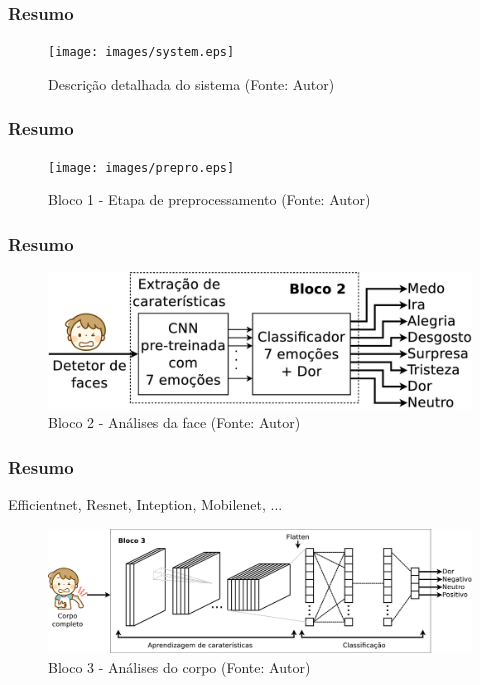 \begin{frame}
\frametitle{Resumo}
\begin{figure}[h!]
\centering
\texttt{[image: images/system.eps]}
\caption{Descrição detalhada do sistema (Fonte: Autor)}
\label{fig:system}
\end{figure} 
\end{frame}

\begin{frame}
\frametitle{Resumo}
\begin{figure}[h!]
\centering
\texttt{[image: images/prepro.eps]}
\caption{Bloco 1 - Etapa de preprocessamento (Fonte: Autor)}
\label{fig:prepro}
\end{figure} 
\end{frame}

\begin{frame}
\frametitle{Resumo}

\begin{figure}[h!]
\centering
\includegraphics[width=0.95\linewidth]{images/system-bloco2.eps}
\caption{Bloco 2 - Análises da face (Fonte: Autor)}
\label{fig:bloco2}
\end{figure} 
\end{frame}


\begin{frame}
\frametitle{Resumo}
Efficientnet, Resnet, Inteption, Mobilenet, ...
\begin{figure}[h!]
\centering
\includegraphics[width=0.95\linewidth]{images/body-image-bloco3.eps}
\caption{Bloco 3 - Análises do corpo (Fonte: Autor)}
\label{fig:bloco3}
\end{figure} 
\end{frame}

